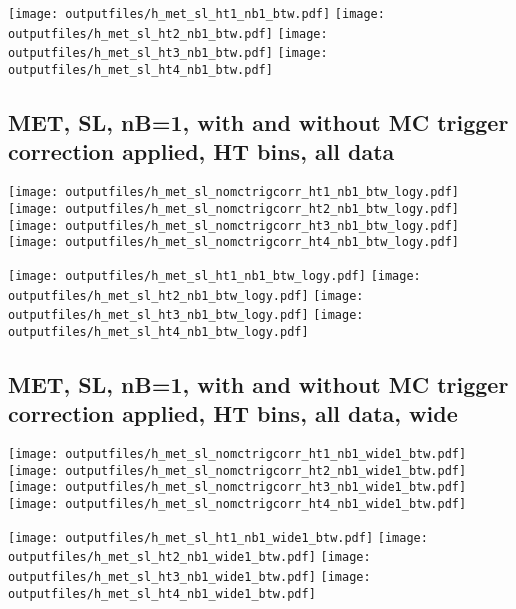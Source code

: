 \documentclass[11pt]{article}
\begin{document}
    \noindent
     \texttt{[image: outputfiles/h\_met\_sl\_ht1\_nb1\_btw.pdf]}
     \texttt{[image: outputfiles/h\_met\_sl\_ht2\_nb1\_btw.pdf]}
     \texttt{[image: outputfiles/h\_met\_sl\_ht3\_nb1\_btw.pdf]}
     \texttt{[image: outputfiles/h\_met\_sl\_ht4\_nb1\_btw.pdf]}

    \clearpage
     \subsection{ MET, SL, nB=1, with and without MC trigger correction applied, HT bins, all data}

    \noindent
     \texttt{[image: outputfiles/h\_met\_sl\_nomctrigcorr\_ht1\_nb1\_btw\_logy.pdf]}
     \texttt{[image: outputfiles/h\_met\_sl\_nomctrigcorr\_ht2\_nb1\_btw\_logy.pdf]}
     \texttt{[image: outputfiles/h\_met\_sl\_nomctrigcorr\_ht3\_nb1\_btw\_logy.pdf]}
     \texttt{[image: outputfiles/h\_met\_sl\_nomctrigcorr\_ht4\_nb1\_btw\_logy.pdf]}


    \noindent
     \texttt{[image: outputfiles/h\_met\_sl\_ht1\_nb1\_btw\_logy.pdf]}
     \texttt{[image: outputfiles/h\_met\_sl\_ht2\_nb1\_btw\_logy.pdf]}
     \texttt{[image: outputfiles/h\_met\_sl\_ht3\_nb1\_btw\_logy.pdf]}
     \texttt{[image: outputfiles/h\_met\_sl\_ht4\_nb1\_btw\_logy.pdf]}


     \clearpage
     \subsection{ MET, SL, nB=1, with and without MC trigger correction applied, HT bins, all data, wide}

    \noindent
     \texttt{[image: outputfiles/h\_met\_sl\_nomctrigcorr\_ht1\_nb1\_wide1\_btw.pdf]}
     \texttt{[image: outputfiles/h\_met\_sl\_nomctrigcorr\_ht2\_nb1\_wide1\_btw.pdf]}
     \texttt{[image: outputfiles/h\_met\_sl\_nomctrigcorr\_ht3\_nb1\_wide1\_btw.pdf]}
     \texttt{[image: outputfiles/h\_met\_sl\_nomctrigcorr\_ht4\_nb1\_wide1\_btw.pdf]}

    \noindent
     \texttt{[image: outputfiles/h\_met\_sl\_ht1\_nb1\_wide1\_btw.pdf]}
     \texttt{[image: outputfiles/h\_met\_sl\_ht2\_nb1\_wide1\_btw.pdf]}
     \texttt{[image: outputfiles/h\_met\_sl\_ht3\_nb1\_wide1\_btw.pdf]}
     \texttt{[image: outputfiles/h\_met\_sl\_ht4\_nb1\_wide1\_btw.pdf]}
\end{document}
